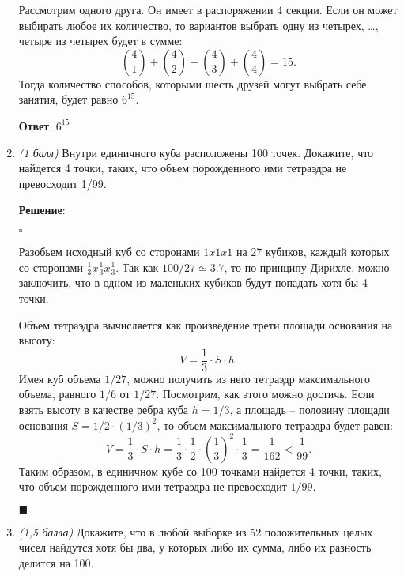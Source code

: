 \documentclass{article}
\begin{document}
\begin{enumerate}
        Рассмотрим одного друга. Он имеет в распоряжении 4 секции. Если он может выбирать любое их количество, то вариантов выбрать одну из четырех, \ldots, четыре из четырех будет в сумме:
        \begin{equation}
            \binom{4}{1} + \binom{4}{2} + \binom{4}{3} + \binom{4}{4} = 15.
        \end{equation}
        Тогда количество способов, которыми шесть друзей могут выбрать себе занятия, будет равно $6^{15}$.

        \textbf{Ответ}:
        $6^{15}$

        \item \textit{(1 балл)} Внутри единичного куба расположены 100 точек. Докажите, что найдется
        4 точки, таких, что объем порожденного ими тетраэдра не превосходит 1/99.

        \textbf{Решение}:

        $\square$

        Разобьем исходный куб со сторонами $1 x 1 x 1$ на 27 кубиков, каждый которых со сторонами $\frac{1}{3} x \frac{1}{3} x \frac{1}{3}$. Так как $100 / 27 \simeq 3.7$, то по принципу Дирихле, можно заключить, что в одном из маленьких кубиков будут попадать хотя бы 4 точки.

        Объем тетраэдра вычисляется как произведение трети площади основания на высоту:
        \begin{equation}
            V = \frac{1}{3}\cdot S\cdot h.
        \end{equation}
        Имея куб объема $1/27$, можно получить из него тетраэдр максимального объема, равного $1/6$ от $1/27$. Посмотрим, как этого можно достичь. Если взять высоту в качестве ребра куба $h=1/3$, а площадь -- половину площади основания $S=1/2\cdot(1/3)^2$, то объем максимального тетраэдра будет равен:
        \begin{equation}
            V = \frac{1}{3}\cdot S\cdot h = \frac{1}{3}\cdot \frac{1}{2}\cdot\left(\frac{1}{3}\right)^2\cdot \frac{1}{3} = \frac{1}{162} < \frac{1}{99}.
        \end{equation}
        Таким образом, в единичном кубе со 100 точками найдется 4 точки, таких, что объем порожденного ими тетраэдра не превосходит $1/99$.

        \begin{flushright}
            $\blacksquare$
        \end{flushright}

        \item \textit{(1,5 балла)} Докажите, что в любой выборке из 52 положительных целых чисел найдутся хотя бы два, у которых либо их сумма, либо их разность делится на 100.
        

\end{enumerate}
\end{document}
